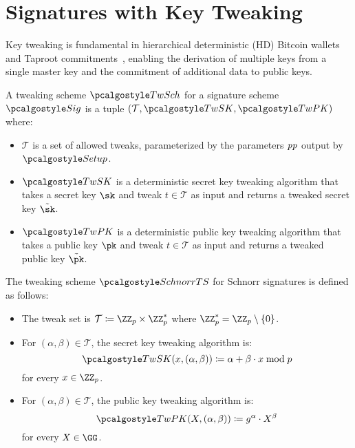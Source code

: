 \section{Signatures with Key Tweaking}\label{sec:signatures-key-tweaking}

Key tweaking is fundamental in hierarchical deterministic (HD) Bitcoin wallets~\cite{add:bip-hdwallets} and Taproot commitments~\cite{add:bip-taproot}, enabling the derivation of multiple keys from a single master key and the commitment of additional data to public keys.

\begin{definition}
  A tweaking scheme $\algo{TwSch}$ for a signature scheme $\algo{Sig}$ is a tuple $(\mathcal{T}, \algo{TwSK}, \algo{TwPK})$ where:
  \begin{itemize}
    \item $\mathcal{T}$ is a set of allowed tweaks, parameterized by the parameters $\mathit{pp}$ output by $\algo{Setup}$.
    \item $\algo{TwSK}$ is a deterministic secret key tweaking algorithm that takes a secret key $\sk$ and tweak $t \in \mathcal{T}$ as input and returns a tweaked secret key $\tilde{\sk}$.
    \item $\algo{TwPK}$ is a deterministic public key tweaking algorithm that takes a public key $\pk$ and tweak $t \in \mathcal{T}$ as input and returns a tweaked public key $\tilde{\pk}$.
  \end{itemize}
\end{definition}

\begin{definition}[SchnorrTS]\label{def:schnorrts}
  The tweaking scheme $\algo{SchnorrTS}$ for Schnorr signatures is defined as follows:
  \begin{itemize}
    \item The tweak set is $\mathcal{T} \defeq \ZZ_p \times \ZZ_p^*$ where $\ZZ_p^* = \ZZ_p \setminus \{0\}$.
    \item For $(\alpha, \beta) \in \mathcal{T}$, the secret key tweaking algorithm is:
    \[
      \algo{TwSK}(x, (\alpha, \beta)) \defeq \alpha + \beta \cdot x \bmod p
    \]
    for every $x \in \ZZ_p$.
    \item For $(\alpha, \beta) \in \mathcal{T}$, the public key tweaking algorithm is:
    \[
      \algo{TwPK}(X, (\alpha, \beta)) \defeq g^\alpha \cdot X^\beta
    \]
    for every $X \in \GG$.
  \end{itemize}
\end{definition}

